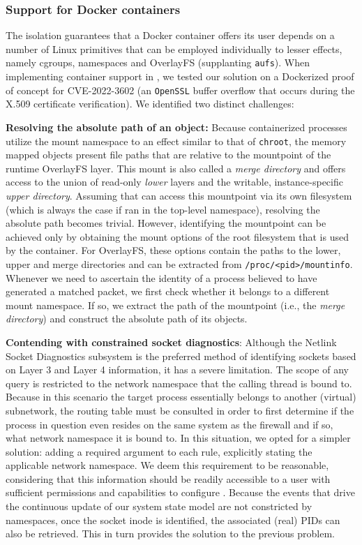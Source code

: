 \subsubsection{Support for Docker containers}

The isolation guarantees that a Docker container offers its user depends on a number of Linux primitives that can be employed individually to lesser effects, namely cgroups, namespaces and OverlayFS (supplanting \texttt{aufs}). When implementing container support in \daf{}, we tested our solution on a Dockerized proof of concept for CVE-2022-3602 (an \texttt{OpenSSL} buffer overflow that occurs during the X.509 certificate verification). We identified two distinct challenges:

\textbf{Resolving the absolute path of an object:} Because containerized processes utilize the mount namespace to an effect similar to that of \texttt{chroot}, the memory mapped objects present file paths that are relative to the mountpoint of the runtime OverlayFS layer. This mount is also called a \textit{merge directory} and offers access to the union of read-only \textit{lower} layers and the writable, instance-specific \textit{upper directory}. Assuming that \daf{} can access this mountpoint via its own filesystem (which is always the case if ran in the top-level namespace), resolving the absolute path becomes trivial. However, identifying the mountpoint can be achieved only by obtaining the mount options of the root filesystem that is used by the container. For OverlayFS, these options contain the paths to the lower, upper and merge directories and can be extracted from \texttt{/proc/<pid>/mountinfo}. Whenever we need to ascertain the identity of a process believed to have generated a matched packet, we first check whether it belongs to a different mount namespace. If so, we extract the path of the mountpoint (i.e., the \textit{merge directory}) and construct the absolute path of its objects.

\textbf{Contending with constrained socket diagnostics}: Although the Netlink Socket Diagnostics subsystem is the preferred method of identifying sockets based on Layer 3 and Layer 4 information, it has a severe limitation. The scope of any query is restricted to the network namespace that the calling thread is bound to. Because in this scenario the target process essentially belongs to another (virtual) subnetwork, the routing table must be consulted in order to first determine if the process in question even resides on the same system as the firewall and if so, what network namespace it is bound to. In this situation, we opted for a simpler solution: adding a required argument to each rule, explicitly stating the applicable network namespace. We deem this requirement to be reasonable, considering that this information should be readily accessible to a user with sufficient permissions and capabilities to configure \daf{}. Because the events that drive the continuous update of our system state model are not constricted by namespaces, once the socket inode is identified, the associated (real) PIDs can also be retrieved. This in turn provides the solution to the previous problem.

